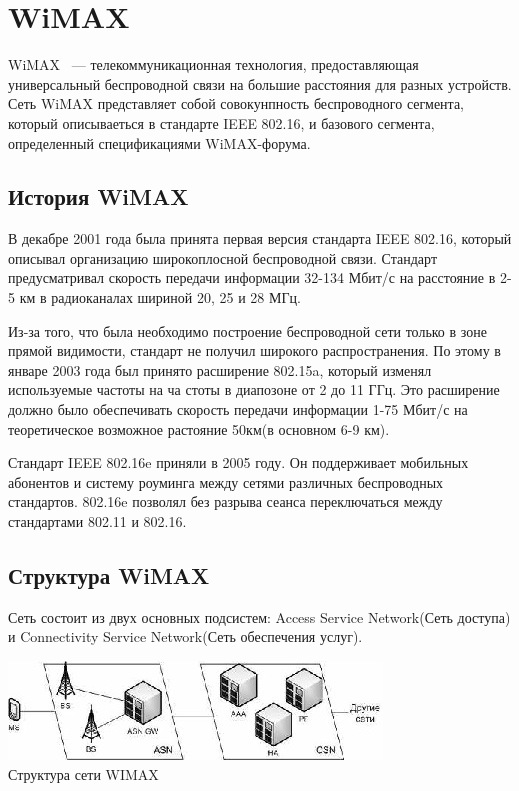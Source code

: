 \documentclass[14pt,a4paper]{article}
\begin{document}
\section{WiMAX}
WiMAX\cite{wikiWiMAX:website} ~--- телекоммуникационная технология,
предоставляющая универсальный беспроводной связи на большие расстояния для
разных устройств. Сеть WiMAX представляет собой совокунпность беспроводного
сегмента, который описываеться в стандарте IEEE 802.16, и базового сегмента, определенный
спецификациями WiMAX-форума\cite{WiMAXForum:website}.
\subsection{История WiMAX}
В декабре 2001 года была принята первая версия стандарта IEEE 802.16, который
описывал организацию широкоплосной беспроводной связи. Стандарт предусматривал 
скорость передачи информации 32-134 Мбит/с на расстояние в 2-5 км в радиоканалах
шириной 20, 25 и 28 МГц.

Из-за того, что была необходимо построение беспроводной сети только в зоне
прямой видимости, стандарт не получил широкого распространения. По этому в
январе 2003 года был принято расширение 802.15a, который изменял используемые
частоты на ча стоты в диапозоне от 2 до 11 ГГц. Это расширение должно было
обеспечивать скорость передачи информации 1-75 Мбит/с на теоретическое возможное
растояние 50км(в основном 6-9 км).

Стандарт IEEE 802.16e приняли в 2005 году. Он поддерживает мобильных абонентов и
систему роуминга между сетями различных беспроводных стандартов. 802.16e
позволял без разрыва сеанса переключаться между стандартами 802.11 и 802.16.

\subsection{Структура\cite{PathWiMAX} WiMAX}
Сеть состоит из двух основных подсистем: Access Service Network(Сеть доступа) и
Connectivity Service Network(Сеть обеспечения услуг).

\begin{center}
\includegraphics[scale=0.75]{WIMAX}\\
Структура сети WIMAX
\end{center}
\end{document}
